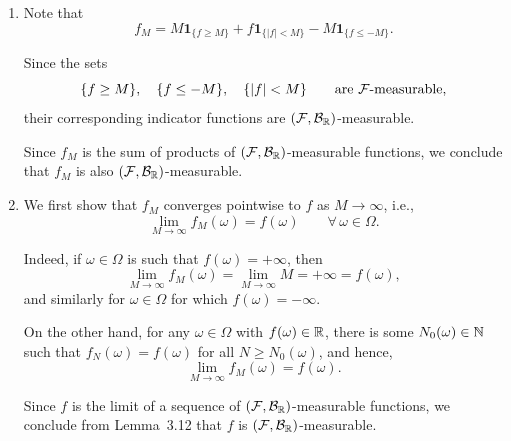 \begin{enumerate}[label=(\alph*)]
	\item {}
	
	Note that
	\[
		f_M = M\mathbf{1}_{\{f\ge M\}} + f\mathbf{1}_{\{|f|< M\}} - M\mathbf{1}_{\{f\le -M\}}.
	\]
	
	Since the sets
	\[
		\{f\ge M\},\quad \{f\le -M\},\quad \{|f|<M\}\qquad\text{are $\mathcal F$-measurable},
	\]
	their corresponding indicator functions are $(\mathcal F,\mathcal B_{\mathbb R})$-measurable. 
	
	Since $f_M$ is the sum of products of $(\mathcal F,\mathcal B_{\mathbb R})$-measurable functions, we conclude that $f_M$ is also $(\mathcal F,\mathcal B_{\mathbb R})$-measurable.
	
	\item {}
	We first show that $f_M$ converges pointwise to $f$ as $M\to\infty$, i.e.,
	\[
		\lim_{M\to\infty} f_M(\omega) = f(\omega)\qquad\forall\, \omega\in\Omega.
	\]
	
	Indeed, if $\omega \in \Omega$ is such that $f(\omega)=+\infty$, then
	\[
		\lim_{M\to\infty} f_M(\omega) = \lim_{M\to\infty} M = +\infty = f(\omega),
	\]
	and similarly for $\omega\in\Omega$ for which $f(\omega)=-\infty$. 
	
	On the other hand, for any $\omega\in\Omega$ with $f(\omega)\in\mathbb R$, there is some $N_0(\omega)\in\mathbb N$ such that $f_N(\omega)=f(\omega)$ for all $N\ge N_0(\omega)$, and hence,
	\[
		\lim_{M\to\infty} f_M(\omega) = f(\omega).
	\]
	
	Since $f$ is the limit of a sequence of $(\mathcal F,\mathcal B_{\mathbb R})$-measurable functions, we conclude from Lemma~3.12 that $f$ is $(\mathcal F,\mathcal B_{\mathbb R})$-measurable.
\end{enumerate}




